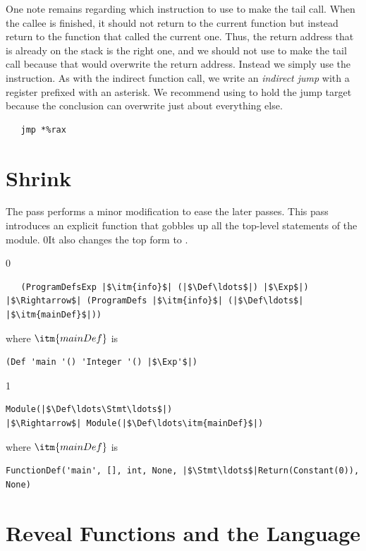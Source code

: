 \documentclass[7x10]{TimesAPriori_MIT}%
\def\racketEd{0}
\def\pythonEd{1}
\def\edition{1}
\newcommand{\racket}[1]{{\if\edition\racketEd{#1}\fi}}
\newcommand{\pythonColor}[0]{}
\numberwithin{theorem}{chapter}
\numberwithin{definition}{chapter}
\numberwithin{equation}{chapter}
\begin{document}
One note remains regarding which instruction to use to make the tail
call. When the callee is finished, it should not return to the current
function but instead return to the function that called the current
one. Thus, the return address that is already on the stack is the
right one, and we should not use  to make the tail call
because that would overwrite the return address. Instead we simply use
the  instruction. As with the indirect function call, we write
an \emph{indirect jump} with a register
prefixed with an asterisk.  We recommend using  to hold the
jump target because the conclusion can overwrite just about everything
else.
\begin{lstlisting}
   jmp *%rax
\end{lstlisting}


\section{Shrink \LangFun{}}
\label{sec:shrink-r4}

The  pass performs a minor modification to ease the
later passes. This pass introduces an explicit  function
that gobbles up all the top-level statements of the module.
%
\racket{It also changes the top  form to
\code{ProgramDefs}.}

{\if\edition\racketEd  
\begin{lstlisting}
   (ProgramDefsExp |$\itm{info}$| (|$\Def\ldots$|) |$\Exp$|)
|$\Rightarrow$| (ProgramDefs |$\itm{info}$| (|$\Def\ldots$| |$\itm{mainDef}$|))
\end{lstlisting}
where $\itm{mainDef}$ is
\begin{lstlisting}
(Def 'main '() 'Integer '() |$\Exp'$|)
\end{lstlisting}
\fi}
{\if\edition\pythonEd\pythonColor
\begin{lstlisting}
Module(|$\Def\ldots\Stmt\ldots$|)
|$\Rightarrow$| Module(|$\Def\ldots\itm{mainDef}$|)
\end{lstlisting}
where $\itm{mainDef}$ is
\begin{lstlisting}
FunctionDef('main', [], int, None, |$\Stmt\ldots$|Return(Constant(0)), None)
\end{lstlisting}
\fi}

\section{Reveal Functions and the \LangFunRef{} Language}
\label{sec:reveal-functions-r4}
\end{document}
